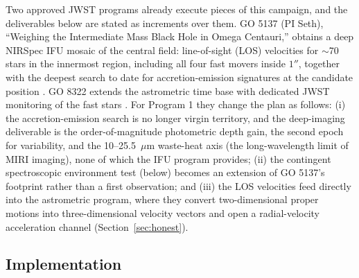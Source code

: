 \documentclass[11pt]{article}
\begin{document}
Two approved JWST programs already execute pieces of this campaign, and the deliverables below are stated as increments over them. GO 5137 (PI Seth), ``Weighing the Intermediate Mass Black Hole in Omega Centauri,'' obtains a deep NIRSpec IFU mosaic of the central field: line-of-sight (LOS) velocities for $\sim$70 stars in the innermost region, including all four fast movers inside $1''$, together with the deepest search to date for accretion-emission signatures at the candidate position \citep{JWSTGO5137}. GO 8322 extends the astrometric time base with dedicated JWST monitoring of the fast stars \citep{JWSTGO8322}. For Program 1 they change the plan as follows: (i) the accretion-emission search is no longer virgin territory, and the deep-imaging deliverable is the order-of-magnitude photometric depth gain, the second epoch for variability, and the 10--25.5~$\mu$m waste-heat axis (the long-wavelength limit of MIRI imaging), none of which the IFU program provides; (ii) the contingent spectroscopic environment test (below) becomes an extension of GO 5137's footprint rather than a first observation; and (iii) the LOS velocities feed directly into the astrometric program, where they convert two-dimensional proper motions into three-dimensional velocity vectors and open a radial-velocity acceleration channel (Section~\ref{sec:honest}).

\subsection{Implementation}
\end{document}
